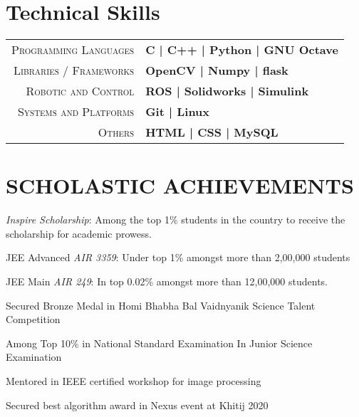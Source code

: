 \documentclass[]{deedy-resume-openfont}
\begin{document}
\begin{minipage}[t]{0.66\textwidth}
\begin{tightemize}
\end{tightemize}
\sectionsep


\section{Technical Skills}
\begin{tabular}{r|p{15cm}}
\textsc{Programming Languages} & \textbf{ C | C++ | Python | GNU Octave} \\
\textsc{Libraries / Frameworks} & \textbf{OpenCV | Numpy | flask }\\
\textsc{Robotic and Control} & \textbf{ROS | Solidworks | Simulink }\\
\textsc{Systems and Platforms} & \textbf{Git | Linux }\\
\textsc{Others} & \textbf{HTML | CSS | MySQL }\\
\end{tabular}

\section{SCHOLASTIC ACHIEVEMENTS}

\vspace{\topsep} %
\begin{tightemize}

\item {\emph{Inspire Scholarship}:} Among the top 1\% students in the country to receive the scholarship for academic prowess. \\
\item{JEE Advanced \emph{AIR 3359}:} Under top 1\% amongst more than 2,00,000 students \\
\item {JEE Main \emph{AIR 249}:} In top 0.02\% amongst more than 12,00,000 students. \\
\item {Secured Bronze Medal in Homi Bhabha Bal Vaidnyanik Science Talent Competition}\\
\item {Among Top 10\% in National Standard Examination In Junior Science Examination}\\
\item {Mentored in IEEE certified workshop for image processing  }\\
\item {Secured best algorithm award in Nexus event at Khitij 2020}
\end{tightemize}
\sectionsep


\end{minipage} 
\end{document}
